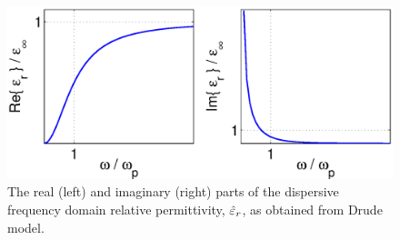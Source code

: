 \begin{figure}[htbp!]
  \begin{center}
    \includegraphics[scale=0.7]{Figures/Chapters/PhysicalProblem/drudePermittivity}
  \end{center}
  \caption{The real (left) and imaginary (right) parts of the dispersive
    frequency domain relative permittivity, $\hat{\varepsilon}_r$, as obtained from
    Drude model.}
  \label{fig:read-and-imag-effective-permittivity}
\end{figure}

